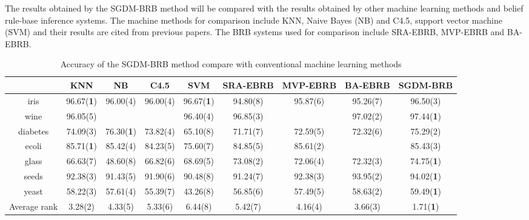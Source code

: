 \documentclass{ieeeaccess}
\begin{document}
The results obtained by the SGDM-BRB method will be compared with the results obtained by
other machine learning methods and belief rule-base inference systems.
The machine methods for comparison include KNN, Naive Bayes (NB) and C4.5, support vector machine (SVM)
and their results are cited from previous papers\cite{a22,a27}.
The BRB systems used for comparison include SRA-EBRB\cite{a20}, MVP-EBRB\cite{a21} and BA-EBRB\cite{a22}.

\begin{table}
    \caption{Accuracy of the SGDM-BRB method compare with conventional machine learning methods}
    \centering
    \normalsize
    \label{tab5}
    \begin{tabular}{|c|c|c|c|c|c|c|c|c|}
        \hline
                     & KNN               & NB                & C4.5     & SVM               & SRA-EBRB & MVP-EBRB & BA-EBRB  & SGDM-BRB          \\
        \hline
        iris         & 96.67(\textbf{1}) & 96.00(4)          & 96.00(4) & 96.67(\textbf{1}) & 94.80(8) & 95.87(6) & 95.26(7) & 96.50(3)          \\
        wine         & 96.05(5)          &                   &          & 96.40(4)          & 96.85(3) &          & 97.02(2) & 97.44(\textbf{1}) \\
        diabetes     & 74.09(3)          & 76.30(\textbf{1}) & 73.82(4) & 65.10(8)          & 71.71(7) & 72.59(5) & 72.32(6) & 75.29(2)          \\
        ecoli        & 85.71(\textbf{1}) & 85.42(4)          & 84.23(5) & 75.60(7)          & 84.85(5) & 85.61(2) &          & 85.43(3)          \\
        glass        & 66.63(7)          & 48.60(8)          & 66.82(6) & 68.69(5)          & 73.08(2) & 72.06(4) & 72.32(3) & 74.75(\textbf{1}) \\
        seeds        & 92.38(3)          & 91.43(5)          & 91.90(6) & 90.48(8)          & 91.24(7) & 92.38(3) & 93.95(2) & 94.02(\textbf{1}) \\
        yeast        & 58.22(3)          & 57.61(4)          & 55.39(7) & 43.26(8)          & 56.85(6) & 57.49(5) & 58.63(2) & 59.49(\textbf{1}) \\
        \hline
        Average rank & 3.28(2)           & 4.33(5)           & 5.33(6)  & 6.44(8)           & 5.42(7)  & 4.16(4)  & 3.66(3)  & 1.71(\textbf{1})  \\
        \hline
    \end{tabular}
\end{table}
\end{document}

